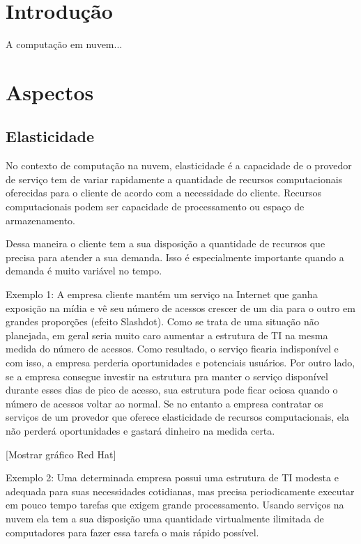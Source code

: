 
\section{Introdução}
A computação em nuvem... \cite{acm:s3,wired:end,akita}

\section{Aspectos}

\subsection{Elasticidade}



No contexto de computação na nuvem, elasticidade é a capacidade de o provedor de serviço tem de variar rapidamente a quantidade de recursos computacionais oferecidas para o cliente de acordo com a necessidade do cliente. Recursos computacionais podem ser capacidade de processamento ou espaço de armazenamento.


Dessa maneira o cliente tem a sua disposição a quantidade de recursos que precisa para atender a sua demanda. Isso é especialmente importante quando a demanda é muito variável no tempo.

Exemplo 1: A empresa cliente mantém um serviço na Internet que ganha exposição na mídia e vê seu número de acessos crescer de um dia para o outro em grandes proporções (efeito Slashdot). Como se trata de uma situação não planejada, em geral seria muito caro aumentar a estrutura de TI na mesma medida do número de acessos. Como resultado, o serviço ficaria indisponível e com isso, a empresa perderia oportunidades e potenciais usuários. Por outro lado, se a empresa consegue investir na estrutura pra manter o serviço disponível durante esses dias de pico de acesso, sua estrutura pode ficar ociosa quando o número de acessos voltar ao normal. Se no entanto a empresa contratar os serviços de um provedor que oferece elasticidade de recursos computacionais, ela não perderá oportunidades e gastará dinheiro na medida certa.

[Mostrar gráfico Red Hat]

Exemplo 2: Uma determinada empresa possui uma estrutura de TI modesta e adequada para suas necessidades cotidianas, mas precisa periodicamente executar em pouco tempo tarefas que exigem grande processamento. Usando serviços na nuvem ela tem a sua disposição uma quantidade virtualmente ilimitada de computadores para fazer essa tarefa o mais rápido possível.

